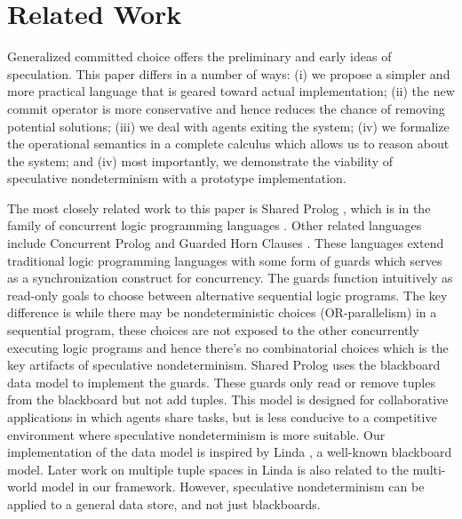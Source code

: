 \section{Related Work}\label{sec:related}

Generalized committed choice \cite{Jaffar05:coma,JaffarYZ07}
offers the preliminary and early ideas of speculation. 
This paper differs in a number of ways: 
(i) we propose a simpler and more practical language that is geared
toward actual implementation;
(ii) the new commit operator is more conservative and hence reduces
the chance of removing potential solutions;
(iii) we deal with agents exiting the system;
(iv) we formalize the operational semantics in 
a complete calculus which allows us to reason about the system;
and (iv) most importantly, we demonstrate the viability of speculative
nondeterminism with a prototype implementation.

The most closely related work to this paper is Shared Prolog \cite{BrogiC91},
which is in the family of concurrent
logic programming languages \cite{Shapiro89:CLP-survey}. Other related
languages include Concurrent Prolog \cite{ShapiroT83:ConProlog} and 
Guarded Horn Clauses \cite{Ueda85:guarded}. These languages extend 
traditional logic programming languages with some form of 
guards \cite{Dijkstra75:guarded} which serves as a synchronization
construct for concurrency. 
The guards function intuitively as read-only goals 
to choose between alternative sequential logic programs. 
The key difference is while there may be
nondeterministic choices (OR-parallelism) in a sequential program,
these choices are not exposed to the other concurrently executing
logic programs and hence there's no combinatorial choices 
which is the key artifacts of speculative nondeterminism.
Shared Prolog uses the blackboard data model to implement the guards.
These guards only read or remove tuples from
the blackboard but not add tuples. This model is designed for
collaborative applications in which agents share tasks,
but is less conducive to a competitive
environment where speculative nondeterminism is more
suitable. 
Our implementation of the data model is
inspired by Linda \cite{GelernterC92}, 
a well-known blackboard model. 
Later work on multiple tuple spaces in Linda \cite{Gelernter89multiple}
is also related to the multi-world model in our framework. 
However, speculative nondeterminism can be applied to 
a general data store, and not just blackboards.

